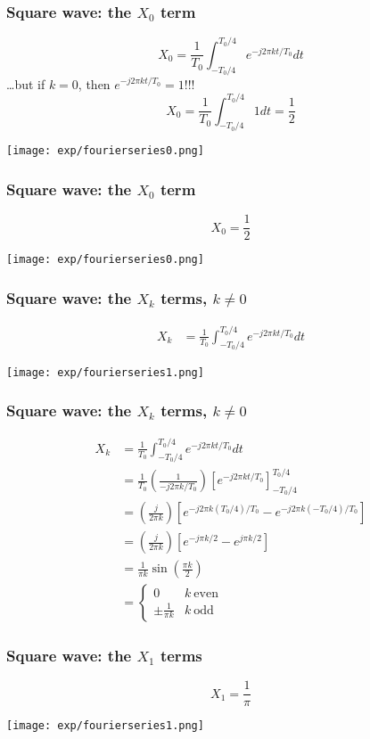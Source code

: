 \documentclass{beamer}
\begin{document}
\begin{frame}
  \frametitle{Square wave: the $X_0$ term}
    \[
    X_0 = \frac{1}{T_0}\int_{-T_0/4}^{T_0/4} e^{-j2\pi k t/T_0}dt
    \]
    \ldots but if $k=0$, then $e^{-j2\pi kt/T_0}=1$!!!
    \[
    X_0=\frac{1}{T_0}\int_{-T_0/4}^{T_0/4} 1 dt=\frac{1}{2}
    \]
    \centerline{\texttt{[image: exp/fourierseries0.png]}}
\end{frame}

\begin{frame}
  \frametitle{Square wave: the $X_0$ term}
    \[
    X_0 = \frac{1}{2}
    \]
    \centerline{\texttt{[image: exp/fourierseries0.png]}}
\end{frame}

\begin{frame}
  \frametitle{Square wave: the $X_k$ terms, $k\ne 0$}
  \begin{align*}
  X_k &= \frac{1}{T_0}\int_{-T_0/4}^{T_0/4} e^{-j2\pi k t/T_0}dt
  \end{align*}
  \centerline{\texttt{[image: exp/fourierseries1.png]}}
\end{frame}

\begin{frame}
  \frametitle{Square wave: the $X_k$ terms, $k\ne 0$}
  \begin{align*}
    X_k &= \frac{1}{T_0}\int_{-T_0/4}^{T_0/4} e^{-j2\pi k t/T_0}dt\\
    &= \frac{1}{T_0}\left(\frac{1}{-j2\pi k/T_0}\right)\left[e^{-j2\pi k t/T_0}\right]_{-T_0/4}^{T_0/4}\\
    &= \left(\frac{j}{2\pi k}\right)\left[e^{-j2\pi k (T_0/4)/T_0}-e^{-j2\pi k (-T_0/4)/T_0}\right]\\
    &= \left(\frac{j}{2\pi k}\right)\left[e^{-j\pi k/2}-e^{j\pi k/2}\right]\\
    &= \frac{1}{\pi k}\sin\left(\frac{\pi k}{2}\right)\\
    &= \left\{\begin{array}{ll}
    0 & k~\mbox{even}\\
    \pm\frac{1}{\pi k} & k~\mbox{odd}
    \end{array}\right.
  \end{align*}
\end{frame}

\begin{frame}
  \frametitle{Square wave: the $X_1$ terms}
  \[
  X_1 = \frac{1}{\pi}
  \]
  \centerline{\texttt{[image: exp/fourierseries1.png]}}
\end{frame}
\end{document}
